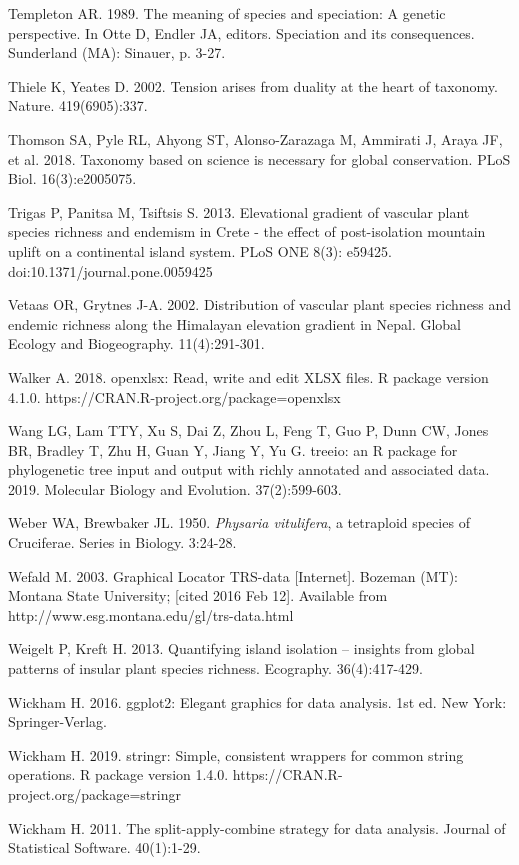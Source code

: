 Templeton AR. 1989. The meaning of species and speciation: A genetic perspective. In Otte D, Endler JA, editors. Speciation and its consequences. Sunderland (MA): Sinauer, p. 3-27.

Thiele K, Yeates D. 2002. Tension arises from duality at the heart of taxonomy. Nature. 419(6905):337.

Thomson SA, Pyle RL, Ahyong ST, Alonso-Zarazaga M, Ammirati J, Araya JF, et al. 2018. Taxonomy based on science is necessary for global conservation. PLoS Biol. 16(3):e2005075.

Trigas P, Panitsa M, Tsiftsis S. 2013. Elevational gradient of vascular plant species richness and endemism in Crete - the effect of post-isolation mountain uplift on a continental island system. PLoS ONE 8(3): e59425. doi:10.1371/journal.pone.0059425

Vetaas OR, Grytnes J-A. 2002. Distribution of vascular plant species richness and endemic richness along the Himalayan elevation gradient in Nepal. Global Ecology and Biogeography. 11(4):291-301.

Walker A. 2018. openxlsx: Read, write and edit XLSX files. R package version 4.1.0. https://CRAN.R-project.org/package=openxlsx

Wang LG, Lam TTY, Xu S, Dai Z, Zhou L, Feng T, Guo P, Dunn CW, Jones BR, Bradley T, Zhu H, Guan Y, Jiang Y, Yu G. treeio: an R package for phylogenetic tree input and output with richly annotated and associated data. 2019. Molecular Biology and Evolution. 37(2):599-603.



Weber WA, Brewbaker JL. 1950. \textit{Physaria vitulifera}, a tetraploid species of Cruciferae. Series in Biology. 3:24-28.

Wefald M. 2003. Graphical Locator TRS-data [Internet]. Bozeman (MT): Montana State University; [cited 2016 Feb 12]. Available from http://www.esg.montana.edu/gl/trs-data.html

Weigelt P, Kreft H. 2013. Quantifying island isolation – insights from global patterns of insular plant species richness. Ecography. 36(4):417-429.


Wickham H. 2016. ggplot2: Elegant graphics for data analysis. 1st ed. New York: Springer-Verlag.

Wickham H. 2019. stringr: Simple, consistent wrappers for common string operations. R package version 1.4.0. https://CRAN.R-project.org/package=stringr

Wickham H. 2011. The split-apply-combine strategy for data analysis. Journal of Statistical Software. 40(1):1-29.

